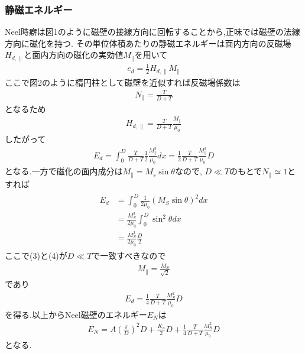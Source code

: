 \documentclass[uplatex,a4j,11pt,dvipdfmx]{jsarticle}
\begin{document}
\subsubsection*{静磁エネルギー}
Neel時癖は図1のように磁壁の接線方向に回転することから,正味では磁壁の法線方向に磁化を持つ.
その単位体積あたりの静磁エネルギーは面内方向の反磁場$H_{d,\parallel}$と面内方向の磁化の実効値$M_{\parallel}$を用いて
\begin{align*}
  e_d=\frac{1}{2}H_{d,\parallel}M_{\parallel}
\end{align*}
ここで図2のように楕円柱として磁壁を近似すれば反磁場係数は
\begin{align*}
  N_{\parallel}=\frac{T}{D+T}
\end{align*}
となるため
\begin{align*}
  H_{d,\parallel}=\frac{T}{D+T}\frac{M_{\parallel}}{\mu_0}
\end{align*}
したがって
\begin{align}
  E_d=\int_0^D\frac{T}{D+T}\frac{1}{2}\frac{M_\parallel^2}{\mu_0}dx=\frac{1}{2}\frac{T}{D+T}\frac{M_\parallel^2}{\mu_0}D
\end{align}
となる.一方で磁化の面内成分は$M_\parallel=M_s\sin\theta$なので,
$D\ll T$のもとで$N_\parallel\simeq1$とすれば
\begin{align}
  \begin{split}
    E_d&=\int_0^D\frac{1}{2\mu_0}\left(M_S\sin\theta\right)^2dx\\
    &=\frac{M_S^2}{2\mu_0}\int_0^D\sin^2\theta dx\\
    &=\frac{M_S^2}{2\mu_0}\frac{D}{2}
  \end{split}
\end{align}
ここで(3)と(4)が$D\ll T$で一致すべきなので
\begin{align*}
  M_\parallel=\frac{M_S}{\sqrt{2}}
\end{align*}
であり
\begin{align*}
  E_d=\frac{1}{4}\frac{T}{D+T}\frac{M_S^2}{\mu_0}D
\end{align*}
を得る.以上からNeel磁壁のエネルギー$E_N$は
\begin{align*}
  E_N=A\left(\frac{\pi}{D}\right)^2D+\frac{K_u}{2}D+\frac{1}{4}\frac{T}{D+T}\frac{M_S^2}{\mu_0}D
\end{align*}
となる.
\end{document}
